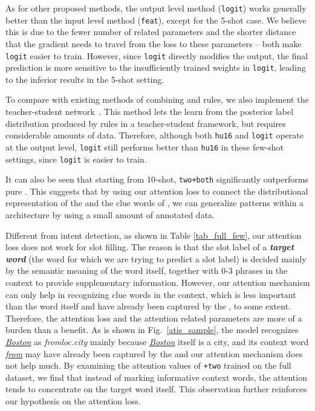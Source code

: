 As for other proposed methods, the output level method (\texttt{logit}) works generally better than the input level method (\texttt{feat}),
except for the 5-shot case. We believe this is due to the fewer number of \RE related parameters and the shorter distance that the gradient
needs to travel from the loss to these parameters -- both make \texttt{logit} easier to train. However, since \texttt{logit} directly
modifies the output, the final prediction is more sensitive to the insufficiently trained weights in \texttt{logit}, leading to the
inferior results in the 5-shot setting.

To compare with existing methods of combining \NN and rules, we also implement the teacher-student network~\cite{hu2016harnessing}. This
method lets the \NN learn from the posterior label distribution produced by \FOL rules in a teacher-student framework, but requires
considerable amounts of data. Therefore, although both \texttt{hu16} and \texttt{logit} operate at the output level, \texttt{logit} still
performs better than \texttt{hu16} in these few-shot settings, since \texttt{logit} is easier to train.


It can also be seen that starting from 10-shot, \texttt{two+both} significantly outperforms pure \REO. This suggests that by using our
attention loss to connect the distributional representation of the \NN and the clue words of \REs, we can generalize \RE patterns within a
\NN architecture by using a small amount of annotated data.


Different from intent detection, as shown in Table \ref{tab_full_few}, our attention loss does not work for slot filling.
The reason is that the slot label of a \textbf{\emph{target word}} (the word for which we are trying to predict a slot label) is decided
mainly by the semantic meaning of the word itself, together with 0-3 phrases in the context to provide supplementary information. However,
our attention mechanism can only help in recognizing clue words in the context, which is less important than the word itself and have
already been captured by the \BLSTM, to some extent. Therefore, the attention loss and the attention related parameters are more of a
burden than a benefit. As is shown in Fig.~\ref{atis_sample}, the model recognizes \textsl{\underline{Boston}} as \emph{fromloc.city}
mainly because \textsl{\underline{Boston}} itself is a city, and its  context word \textsl{\underline{from}} may have already been captured
by the \BLSTM and our attention mechanism does not help much. By examining the attention values of \texttt{+two} trained on the full
dataset, we find that instead of marking informative context words, the attention tends to concentrate on the target word itself. This
observation further reinforces our hypothesis on the attention loss.

